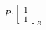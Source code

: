 \documentclass[preview]{standalone}
\begin{document}
\begin{align*}
P \cdot \begin{bmatrix} 1 \\ 1 \end{bmatrix}_B
\end{align*}
\end{document}
